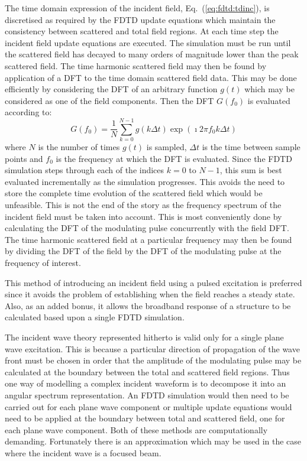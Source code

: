 \documentclass[a4paper, 12pt]{article}
\newcommand{\eq}[1]{Eq.\ (\ref{#1})}
\begin{document}
	The time domain expression of the incident field, \eq{eq:fdtd:tdinc}, is discretised as
	required by the FDTD update equations which maintain the consistency
	between scattered and total field regions. At each time step the
	incident field update equations are executed. The simulation must be
	run until the scattered field has decayed to many orders of magnitude
	lower than the peak scattered field. The time harmonic
	scattered field may then be found by application of a DFT to the time
	domain scattered field data. This may be done efficiently by
	considering the DFT of an arbitrary function $g(t)$ which may be
	considered as one of the field components. Then the DFT $G(f_0)$ is evaluated
	according to:
	\begin{equation}
		\label{eq:fdtd:dft}
		G(f_0)=\frac{1}{N}\sum^{N-1}_{k=0}g(k\Delta t)\exp(\imath2\pi f_0 k\Delta t)
	\end{equation}
	where $N$ is the number of times $g(t)$ is sampled, $\Delta t$ is the
	time between sample points and $f_0$ is the frequency at which the DFT
	is evaluated. Since the FDTD simulation steps through each of the
	indices $k=0$ to $N-1$, this sum is best evaluated incrementally as
	the simulation progresses. This avoids the need to store the complete
	time evolution of the scattered field which would be unfeasible. This
	is not the end of the story as the frequency spectrum of the incident
	field must be taken into account. This is most conveniently done by
	calculating the DFT of the modulating pulse concurrently with the
	field DFT. The time harmonic scattered field at a particular frequency
	may then be found by dividing the DFT of the field by the DFT of the
	modulating pulse at the frequency of interest. 
	
	This method of introducing an incident field using a pulsed excitation
	is preferred since it avoids the problem of establishing when the
	field reaches a steady state. Also, as an added bonus, it allows the
	broadband response of a structure to be calculated based upon a single
	FDTD simulation. 
	
	The incident wave theory represented hitherto is valid only for a single
	plane wave excitation. This is because a particular direction of
	propagation of the wave front must be chosen in order that the
	amplitude of the modulating pulse may be calculated at the boundary
	between the total and scattered field regions. Thus one way of
	modelling a complex incident waveform is to decompose it into an
	angular spectrum representation. An FDTD simulation would then need to
	be carried out for each plane wave component or multiple update
	equations would need to be applied at the boundary between total and
	scattered field, one for each plane wave component. Both of these
	methods are computationally demanding. Fortunately there is an
	approximation which may be used in the case where the incident wave is
	a focused beam.
	
\end{document}
